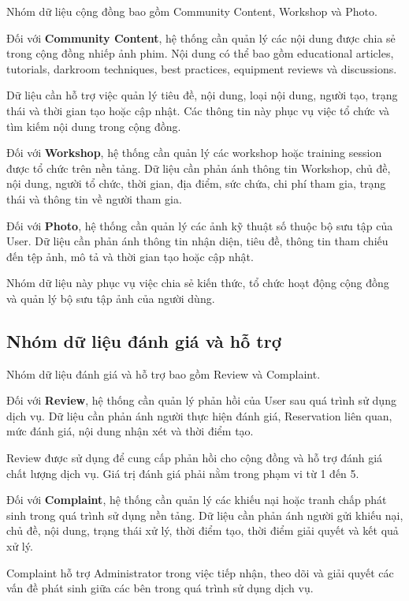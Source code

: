 Nhóm dữ liệu cộng đồng bao gồm Community Content, Workshop và Photo.

Đối với \textbf{Community Content}, hệ thống cần quản lý các nội dung được chia sẻ trong cộng đồng nhiếp ảnh phim. Nội dung có thể bao gồm educational articles, tutorials, darkroom techniques, best practices, equipment reviews và discussions.

Dữ liệu cần hỗ trợ việc quản lý tiêu đề, nội dung, loại nội dung, người tạo, trạng thái và thời gian tạo hoặc cập nhật. Các thông tin này phục vụ việc tổ chức và tìm kiếm nội dung trong cộng đồng.

Đối với \textbf{Workshop}, hệ thống cần quản lý các workshop hoặc training session được tổ chức trên nền tảng. Dữ liệu cần phản ánh thông tin Workshop, chủ đề, nội dung, người tổ chức, thời gian, địa điểm, sức chứa, chi phí tham gia, trạng thái và thông tin về người tham gia.

Đối với \textbf{Photo}, hệ thống cần quản lý các ảnh kỹ thuật số thuộc bộ sưu tập của User. Dữ liệu cần phản ánh thông tin nhận diện, tiêu đề, thông tin tham chiếu đến tệp ảnh, mô tả và thời gian tạo hoặc cập nhật.

Nhóm dữ liệu này phục vụ việc chia sẻ kiến thức, tổ chức hoạt động cộng đồng và quản lý bộ sưu tập ảnh của người dùng.

\subsection{Nhóm dữ liệu đánh giá và hỗ trợ}

Nhóm dữ liệu đánh giá và hỗ trợ bao gồm Review và Complaint.

Đối với \textbf{Review}, hệ thống cần quản lý phản hồi của User sau quá trình sử dụng dịch vụ. Dữ liệu cần phản ánh người thực hiện đánh giá, Reservation liên quan, mức đánh giá, nội dung nhận xét và thời điểm tạo.

Review được sử dụng để cung cấp phản hồi cho cộng đồng và hỗ trợ đánh giá chất lượng dịch vụ. Giá trị đánh giá phải nằm trong phạm vi từ 1 đến 5.

Đối với \textbf{Complaint}, hệ thống cần quản lý các khiếu nại hoặc tranh chấp phát sinh trong quá trình sử dụng nền tảng. Dữ liệu cần phản ánh người gửi khiếu nại, chủ đề, nội dung, trạng thái xử lý, thời điểm tạo, thời điểm giải quyết và kết quả xử lý.

Complaint hỗ trợ Administrator trong việc tiếp nhận, theo dõi và giải quyết các vấn đề phát sinh giữa các bên trong quá trình sử dụng dịch vụ.


